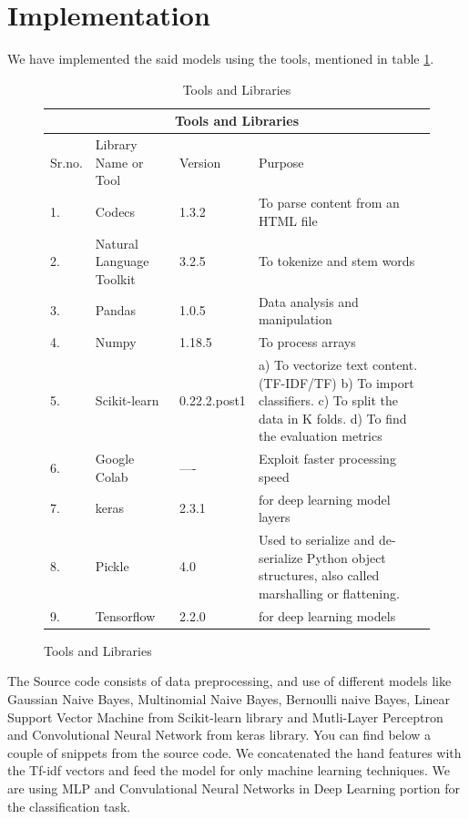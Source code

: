 \documentclass[conference]{IEEEtran}
\begin{document}
\section{Implementation}
\vspace{1mm}
\justify We have implemented the said models using the tools, mentioned in  table \ref{table:1}.
\begin{figure}


\begin{table}[h!]
\centering
\begin{tabular}{ |p{0.5cm}||p{3cm}|p{1.2cm}|p{4cm}|  }
 \hline
 \multicolumn{4}{|c|}{Tools and Libraries} \\
 \hline
 Sr.no. & Library Name or Tool  & Version & Purpose\\
 \hline
 1. & Codecs                    &   1.3.2 &   To parse content from an HTML file       \\
 \hline
 2. & Natural Language Toolkit  & 3.2.5   &    To tokenize and stem words      \\
 \hline
 3. & Pandas                    & 1.0.5    &  Data analysis and manipulation        \\
 \hline
 4. & Numpy                     &  1.18.5  &   To process arrays         \\
 \hline
 5. & Scikit-learn              & 0.22.2.post1   & a) To vectorize text content.
(TF-IDF/TF)
\newline b) To import classifiers.
\newline c) To split the data in K
folds.
\newline d) To find the evaluation
metrics         \\
 \hline
 6. & Google Colab              &  ----  & Exploit faster processing speed \\
 \hline
 7. & keras                       &  2.3.1  & for deep learning model layers                  \\
 \hline
 8. &  Pickle                   & 4.0   &  Used to serialize and de-serialize Python object structures, also called marshalling or flattening.  \\
 \hline
 9. &  Tensorflow                         & 2.2.0   &  for deep learning models              \\
 \hline
\end{tabular}
\vspace{1mm}
\caption{Tools and Libraries}
\label{table:1}
\end{table}
\end{figure}
\justify
The Source code consists of data preprocessing, and use of different models like Gaussian Naive Bayes, Multinomial Naive Bayes, Bernoulli naive Bayes, Linear Support Vector Machine from Scikit-learn library and Mutli-Layer Perceptron and Convolutional Neural Network from keras library. You can find below a couple of snippets from the source code. We concatenated the hand features with the Tf-idf vectors and feed the model for only machine learning techniques. We are using MLP and Convulational Neural Networks in Deep Learning portion for the classification task.
\end{document}
